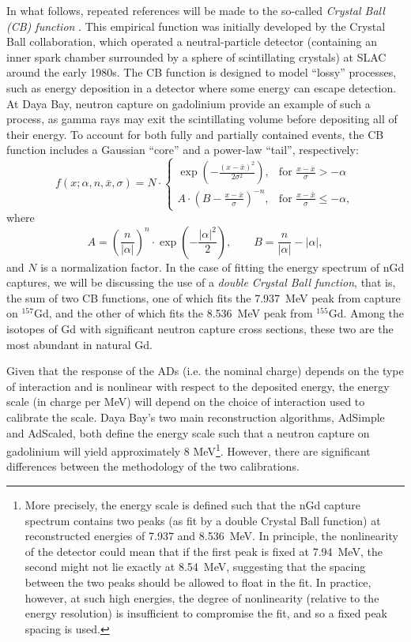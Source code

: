 \documentclass[../thesis.tex]{subfiles}
\begin{document}
In what follows, repeated references will be made to the so-called \emph{Crystal Ball (CB) function} \cite{cbfunction}. This empirical function was initially developed by the Crystal Ball collaboration, which operated a neutral-particle detector (containing an inner spark chamber surrounded by a sphere of scintillating crystals) at SLAC around the early 1980s. The CB function is designed to model ``lossy'' processes, such as energy deposition in a detector where some energy can escape detection. At Daya Bay, neutron capture on gadolinium provide an example of such a process, as gamma rays may exit the scintillating volume before depositing all of their energy. To account for both fully and partially contained events, the CB function includes a Gaussian ``core'' and a power-law ``tail'', respectively:
\begin{equation}
  \label{eq:cbfunction}
  f(x;\alpha,n,\bar x,\sigma) = N \cdot \begin{cases} \exp(- \frac{(x - \bar x)^2}{2 \sigma^2}), & \mbox{for }\frac{x - \bar x}{\sigma} > -\alpha \\
    A \cdot (B - \frac{x - \bar x}{\sigma})^{-n}, & \mbox{for }\frac{x - \bar x}{\sigma} \leqslant -\alpha,\end{cases}
\end{equation}
where
\[
  A = \left(\frac{n}{\left| \alpha \right|}\right)^n \cdot \exp\left(- \frac {\left| \alpha \right|^2}{2}\right),%
  \qquad%
  B = \frac{n}{\left| \alpha \right|}  - \left| \alpha \right|,
\]
and $N$ is a normalization factor. In the case of fitting the energy spectrum of nGd captures, we will be discussing the use of a \emph{double Crystal Ball function}, that is, the sum of two CB functions, one of which fits the 7.937~MeV peak from capture on $^{157}$Gd, and the other of which fits the 8.536~MeV peak from $^{155}$Gd. Among the isotopes of Gd with significant neutron capture cross sections, these two are the most abundant in natural Gd.

Given that the response of the ADs (i.e. the nominal charge) depends on the type of interaction and is nonlinear with respect to the deposited energy, the energy scale (in charge per MeV) will depend on the choice of interaction used to calibrate the scale. Daya Bay's two main reconstruction algorithms, AdSimple and AdScaled, both define the energy scale such that a neutron capture on gadolinium will yield approximately 8 MeV\footnote{More precisely, the energy scale is defined such that the nGd capture spectrum contains two peaks (as fit by a double Crystal Ball function) at reconstructed energies of 7.937 and 8.536~MeV. In principle, the nonlinearity of the detector could mean that if the first peak is fixed at 7.94~MeV, the second might not lie exactly at 8.54~MeV, suggesting that the spacing between the two peaks should be allowed to float in the fit. In practice, however, at such high energies, the degree of nonlinearity (relative to the energy resolution) is insufficient to compromise the fit, and so a fixed peak spacing is used.}. However, there are significant differences between the methodology of the two calibrations.
\end{document}
